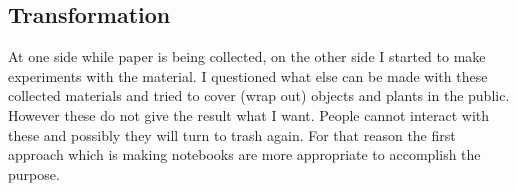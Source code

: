 




\subsection{Transformation}
At one side while paper is being collected, on the other side I started to make experiments with the material. I questioned what else can be made with these collected materials and tried to cover (wrap out) objects and plants in the public. However these do not give the result what I want. People cannot interact with these and possibly they will turn to trash again. For that reason the first approach which is making notebooks are more appropriate to accomplish the purpose.

